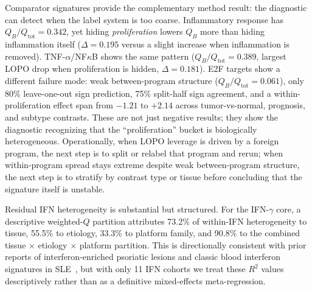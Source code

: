 \documentclass[10pt]{article}
\begin{document}
Comparator signatures provide the complementary method result: the diagnostic can detect when the label system is too coarse. Inflammatory response has $Q_B/Q_{\mathrm{tot}}=0.342$, yet hiding \emph{proliferation} lowers $Q_B$ more than hiding inflammation itself ($\Delta=0.195$ versus a slight increase when inflammation is removed). TNF-$\alpha$/NF$\kappa$B shows the same pattern ($Q_B/Q_{\mathrm{tot}}=0.389$, largest LOPO drop when proliferation is hidden, $\Delta=0.181$). E2F targets show a different failure mode: weak between-program structure ($Q_B/Q_{\mathrm{tot}}=0.061$), only 80\% leave-one-out sign prediction, 75\% split-half sign agreement, and a within-proliferation effect span from $-1.21$ to $+2.14$ across tumor-vs-normal, prognosis, and subtype contrasts. These are not just negative results; they show the diagnostic recognizing that the ``proliferation'' bucket is biologically heterogeneous. Operationally, when LOPO leverage is driven by a foreign program, the next step is to split or relabel that program and rerun; when within-program spread stays extreme despite weak between-program structure, the next step is to stratify by contrast type or tissue before concluding that the signature itself is unstable.

Residual IFN heterogeneity is substantial but structured. For the IFN-$\gamma$ core, a descriptive weighted-$Q$ partition attributes 73.2\% of within-IFN heterogeneity to tissue, 55.5\% to etiology, 33.3\% to platform family, and 90.8\% to the combined tissue $\times$ etiology $\times$ platform partition. This is directionally consistent with prior reports of interferon-enriched psoriatic lesions and classic blood interferon signatures in SLE~\cite{yao2008,baechler2003}, but with only 11 IFN cohorts we treat these $R^2$ values descriptively rather than as a definitive mixed-effects meta-regression.
\end{document}
